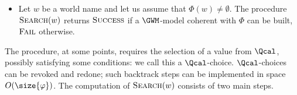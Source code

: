 \begin{itemize}
\item Let $w$ be a world name and let us assume that $\Phi(w)\neq \emptyset$.
The procedure $\textsc{Search}(w)$ returns $\textsc{Success}$ if a $\GWM$-model  coherent with $\Phi$
 can be built,   $\textsc{Fail}$ otherwise.
\end{itemize}

\noindent
The procedure, at some points, requires the selection of a  value from $\Qcal$,
possibly satisfying  some conditions:
we call this a  $\Qcal$-choice.
$\Qcal$-choices can be revoked and redone;
such  backtrack steps can be implemented in space $O(\size{\varphi})$.
The computation of  $\textsc{Search}(w)$  consists of two main steps.

